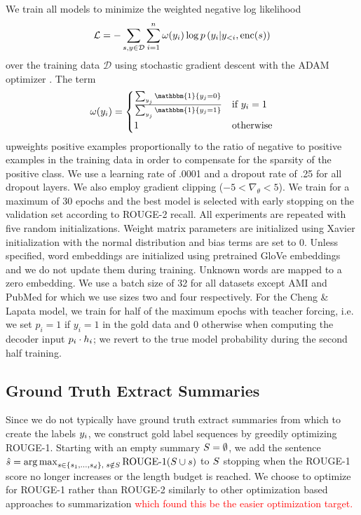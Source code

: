 
We train all models to minimize the weighted negative log likelihood
\[\mathcal{L} = -\sum_{s,y\in \mathcal{D}} \sum_{i=1}^\docSize \omega(y_i) \log p\left(y_i|y_{<i},
\operatorname{enc}(\sent)\right)\]
over the training data $\mathcal{D}$
using stochastic gradient descent with the ADAM optimizer 
\cite{kingma2014adam}. The term 
\[ \omega(y_i)=\begin{cases}
\frac{\sum_{y_j} \mathbbm{1}\{y_j = 0 \}}{ \sum_{y_j} \mathbbm{1}\{y_j = 1 \}  } & \textrm{if $y_i=1$} \\ 1 & \textrm{otherwise}  \end{cases} \] 
        upweights
    positive examples proportionally to the ratio of negative to positive
    examples in the training data in order to compensate for the sparsity
    of the positive class.
    We use a learning rate of .0001 and a dropout rate of .25 for all dropout
    layers. We also employ gradient clipping ($-5 < \nabla_\theta < 5$). 
    We train for a maximum of 30 epochs and the best
    model is selected with early stopping on the validation set according
    to ROUGE-2 recall. All experiments are repeated with five random
    initializations. Weight matrix parameters are initialized using 
    Xavier initialization with the normal distribution 
    \cite{glorot2010understanding} and bias terms are set to 0.
    Unless specified, word embeddings are initialized 
    using pretrained GloVe embeddings \cite{pennington2014glove} and we do 
    not update them during training. Unknown words are mapped to a zero 
    embedding.
    We use a batch size of 32 for all datasets except AMI and PubMed for
    which we use sizes two and four respectively. 
    For the Cheng \& Lapata model, we train for half of the maximum epochs 
    with teacher forcing, i.e. we set $p_i = 1$
    if $y_i = 1$ in the gold data and 0 otherwise 
    when computing the decoder input 
    $p_i \cdot \sentEmb[i]$; we revert to the true model probability 
    during the second half training.

\subsection{Ground Truth Extract Summaries} 
Since we do not typically have ground truth extract summaries from which to
create the labels $\slabel_i$, we construct gold label sequences 
by greedily optimizing ROUGE-1. Starting with an empty summary $\summary = 
\null \emptyset$, we add the sentence $\hat{\sent} = 
{\argmax}_{ \sent \in \{\sent_1, \ldots, \sent_{\docsize}\},
\; \sent \notin \summary} \operatorname{ROUGE-1}(\summary \cup \sent)$
to $S$ stopping when the ROUGE-1 score no longer increases or the 
length budget is reached. We choose to optimize for ROUGE-1 rather than 
ROUGE-2 similarly to other optimization based approaches to summarization 
\textcolor{red}{
\cite{durrett2016learning,sipos2012large,nallapati2017summarunner} which found this
be the easier optimization target.}







